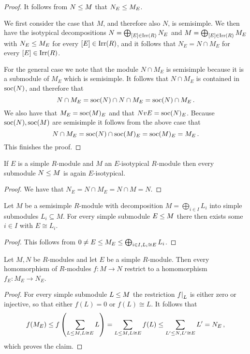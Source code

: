 \begin{proof}
  It follows from $N \leq M$ that $N_E \leq M_E$.
  
  We first consider the case that $M$, and therefore also $N$, is semisimple.
  We then have the isotypical decompositions $N = \bigoplus_{[E] \in \operatorname{Irr}(R)} N_E$ and $M = \bigoplus_{[E] \in \operatorname{Irr}(R)} M_E$ with $N_E \leq M_E$ for every $[E] \in \operatorname{Irr}(R)$, and it follows that $N_E = N \cap M_E$ for every $[E] \in \operatorname{Irr}(R)$.
  
  For the general case we note that the module $N \cap M_E$ is semisimple because it is a submodule of $M_E$ which is semisimple.
  It follows that $N \cap M_E$ is contained in $\operatorname{soc}(N)$, and therefore that
  \[
      N \cap M_E
    = \operatorname{soc}(N) \cap N \cap M_E
    = \operatorname{soc}(N) \cap M_E \,.
  \]
  We also have that $M_E = \operatorname{soc}(M)_E$ and that $NvE = \operatorname{soc}(N)_E$.
  Because $\operatorname{soc}(N), \operatorname{soc}(M)$ are semisimple it follows from the above case that
  \[
      N \cap M_E
    = \operatorname{soc}(N) \cap \operatorname{soc}(M)_E
    = \operatorname{soc}(M)_E
    = M_E \,.
  \]
  This finishes the proof.
\end{proof}


\begin{corollary}
  If $E$ is a simple $R$-module and $M$ an $E$-isotypical $R$-module then every submodule $N \leq M$ is again $E$-isotypical.
\end{corollary}


\begin{proof}
  We have that $N_E = N \cap M_E = N \cap M = N$.
\end{proof}


\begin{lemma}
  Let $M$ be a semisimple $R$-module with decomposition $M = \bigoplus_{i \in I} L_i$ into simple submodules $L_i \subseteq M$.
  For every simple submodule $E \leq M$ there then exists some $i \in I$ with $E \cong L_i$.
\end{lemma}


\begin{proof}
  This follows from $0 \neq E \leq M_E \leq \bigoplus_{i \in I, L_i \cong E} L_i$.
\end{proof}


\begin{lemma}
  Let $M, N$ be $R$-modules and let $E$ be a simple $R$-module.
  Then every homomorphism of $R$-modules $f \colon M \to N$ restrict to a homomorphism $f_E \colon M_E \to N_E$.
\end{lemma}


\begin{proof}
  For every simple submodule $L \leq M$ the restriction $\restrict{f}{L}$ is either zero or injective, so that either $f(L) = 0$ or $f(L) \cong L$.
  It follows that
  \[
              f(M_E)
    \leq f\left(\sum_{L \leq M, L \cong E} L \right)
    =         \sum_{L \leq M, L \cong E} f(L)
    \leq \sum_{L' \leq N, L' \cong E} L'
    =         N_E \,,
  \]
  which proves the claim.
\end{proof}


